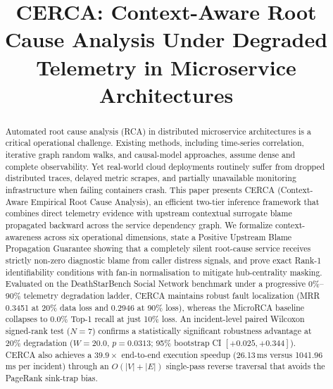 \documentclass[conference]{IEEEtran}
\begin{document}
\title{CERCA: Context-Aware Root Cause Analysis Under Degraded Telemetry in Microservice Architectures}

\author{
\and
{}
}

\maketitle

\begin{abstract}
Automated root cause analysis (RCA) in distributed microservice architectures is a critical operational challenge. Existing methods, including time-series correlation, iterative graph random walks, and causal-model approaches, assume dense and complete observability. Yet real-world cloud deployments routinely suffer from dropped distributed traces, delayed metric scrapes, and partially unavailable monitoring infrastructure when failing containers crash. This paper presents CERCA (Context-Aware Empirical Root Cause Analysis), an efficient two-tier inference framework that combines direct telemetry evidence with upstream contextual surrogate blame propagated backward across the service dependency graph. We formalize context-awareness across six operational dimensions, state a Positive Upstream Blame Propagation Guarantee showing that a completely silent root-cause service receives strictly non-zero diagnostic blame from caller distress signals, and prove exact Rank-1 identifiability conditions with fan-in normalisation to mitigate hub-centrality masking. Evaluated on the DeathStarBench Social Network benchmark under a progressive 0\%--90\% telemetry degradation ladder, CERCA maintains robust fault localization (MRR 0.3451 at 20\% data loss and 0.2946 at 90\% loss), whereas the MicroRCA baseline collapses to 0.0\% Top-1 recall at just 10\% loss. An incident-level paired Wilcoxon signed-rank test ($N=7$) confirms a statistically significant robustness advantage at 20\% degradation ($W=20.0$, $p=0.0313$; 95\% bootstrap CI $[+0.025, +0.344]$). CERCA also achieves a $39.9\times$ end-to-end execution speedup (26.13\,ms versus 1041.96\,ms per incident) through an $O(|V|+|E|)$ single-pass reverse traversal that avoids the PageRank sink-trap bias.
\end{abstract}
\end{document}
